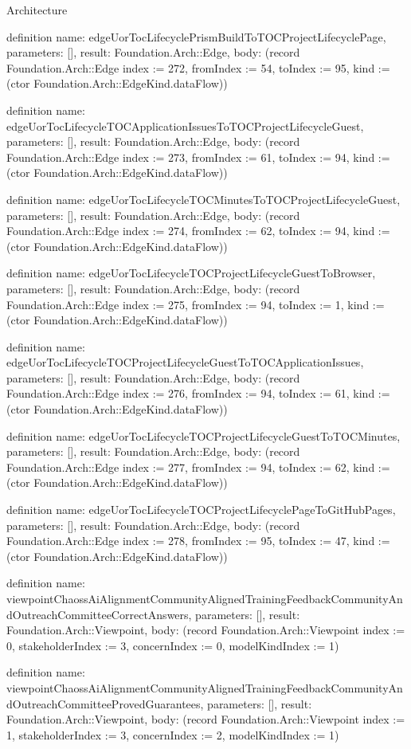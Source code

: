 \begin{lexlean}{Architecture}
\begin{semanticmodule}
definition{
  name: edgeUorTocLifecyclePrismBuildToTOCProjectLifecyclePage,
  parameters: [],
  result: Foundation.Arch::Edge,
  body: (record Foundation.Arch::Edge {index := 272, fromIndex := 54, toIndex := 95, kind := (ctor Foundation.Arch::EdgeKind.dataFlow)})
}

definition{
  name: edgeUorTocLifecycleTOCApplicationIssuesToTOCProjectLifecycleGuest,
  parameters: [],
  result: Foundation.Arch::Edge,
  body: (record Foundation.Arch::Edge {index := 273, fromIndex := 61, toIndex := 94, kind := (ctor Foundation.Arch::EdgeKind.dataFlow)})
}

definition{
  name: edgeUorTocLifecycleTOCMinutesToTOCProjectLifecycleGuest,
  parameters: [],
  result: Foundation.Arch::Edge,
  body: (record Foundation.Arch::Edge {index := 274, fromIndex := 62, toIndex := 94, kind := (ctor Foundation.Arch::EdgeKind.dataFlow)})
}

definition{
  name: edgeUorTocLifecycleTOCProjectLifecycleGuestToBrowser,
  parameters: [],
  result: Foundation.Arch::Edge,
  body: (record Foundation.Arch::Edge {index := 275, fromIndex := 94, toIndex := 1, kind := (ctor Foundation.Arch::EdgeKind.dataFlow)})
}

definition{
  name: edgeUorTocLifecycleTOCProjectLifecycleGuestToTOCApplicationIssues,
  parameters: [],
  result: Foundation.Arch::Edge,
  body: (record Foundation.Arch::Edge {index := 276, fromIndex := 94, toIndex := 61, kind := (ctor Foundation.Arch::EdgeKind.dataFlow)})
}

definition{
  name: edgeUorTocLifecycleTOCProjectLifecycleGuestToTOCMinutes,
  parameters: [],
  result: Foundation.Arch::Edge,
  body: (record Foundation.Arch::Edge {index := 277, fromIndex := 94, toIndex := 62, kind := (ctor Foundation.Arch::EdgeKind.dataFlow)})
}

definition{
  name: edgeUorTocLifecycleTOCProjectLifecyclePageToGitHubPages,
  parameters: [],
  result: Foundation.Arch::Edge,
  body: (record Foundation.Arch::Edge {index := 278, fromIndex := 95, toIndex := 47, kind := (ctor Foundation.Arch::EdgeKind.dataFlow)})
}

definition{
  name: viewpointChaossAiAlignmentCommunityAlignedTrainingFeedbackCommunityAndOutreachCommitteeCorrectAnswers,
  parameters: [],
  result: Foundation.Arch::Viewpoint,
  body: (record Foundation.Arch::Viewpoint {index := 0, stakeholderIndex := 3, concernIndex := 0, modelKindIndex := 1})
}

definition{
  name: viewpointChaossAiAlignmentCommunityAlignedTrainingFeedbackCommunityAndOutreachCommitteeProvedGuarantees,
  parameters: [],
  result: Foundation.Arch::Viewpoint,
  body: (record Foundation.Arch::Viewpoint {index := 1, stakeholderIndex := 3, concernIndex := 2, modelKindIndex := 1})
}


\end{semanticmodule}
\end{lexlean}
